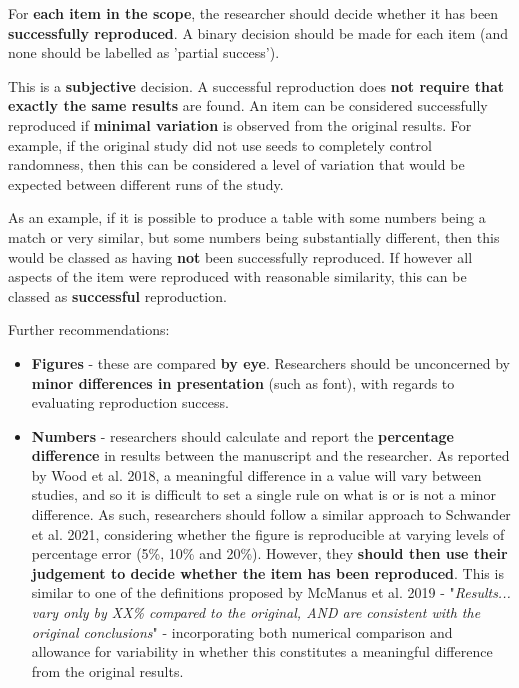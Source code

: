 For \textbf{each item in the scope}, the researcher should decide whether it has been \textbf{successfully reproduced}. A binary decision should be made for each item (and none should be labelled as 'partial success').

This is a \textbf{subjective} decision. A successful reproduction does \textbf{not require that exactly the same results} are found. An item can be considered successfully reproduced if \textbf{minimal variation} is observed from the original results. For example, if the original study did not use seeds to completely control randomness, then this can be considered a level of variation that would be expected between different runs of the study. 

As an example, if it is possible to produce a table with some numbers being a match or very similar, but some numbers being substantially different, then this would be classed as having \textbf{not} been successfully reproduced. If however all aspects of the item were reproduced with reasonable similarity, this can be classed as \textbf{successful} reproduction.

Further recommendations:
\begin{itemize}
    \item \textbf{Figures} - these are compared \textbf{by eye}. Researchers should be unconcerned by \textbf{minor differences in presentation} (such as font), with regards to evaluating reproduction success.
    \item \textbf{Numbers} - researchers should calculate and report the \textbf{percentage difference} in results between the manuscript and the researcher. As reported by Wood et al. 2018,\autocite{wood_push_2018, wood_replication_2018} a meaningful difference in a value will vary between studies, and so it is difficult to set a single rule on what is or is not a minor difference. As such, researchers should follow a similar approach to Schwander et al. 2021,\autocite{schwander_replication_2021} considering whether the figure is reproducible at varying levels of percentage error (5\%, 10\% and 20\%). However, they \textbf{should then use their judgement to decide whether the item has been reproduced}. This is similar to one of the definitions proposed by McManus et al. 2019\autocite{mcmanus_can_2019} - "\textit{Results... vary only by XX\% compared to the original, AND are consistent with the original conclusions}" - incorporating both numerical comparison and allowance for variability in whether this constitutes a meaningful difference from the original results.
\end{itemize}

